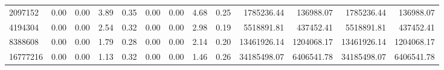 \begin{tabular}{lrrrrrrrrrrrr}
2097152  &        0.00 &        0.00 &          3.89 &          0.35 &           0.00 &           0.00 &         4.68 &         0.25 &       1785236.44 &        136988.07 &      1785236.44 &       136988.07 \\
4194304  &        0.00 &        0.00 &          2.54 &          0.32 &           0.00 &           0.00 &         2.98 &         0.19 &       5518891.81 &        437452.41 &      5518891.81 &       437452.41 \\
8388608  &        0.00 &        0.00 &          1.79 &          0.28 &           0.00 &           0.00 &         2.14 &         0.20 &      13461926.14 &       1204068.17 &     13461926.14 &      1204068.17 \\
16777216 &        0.00 &        0.00 &          1.13 &          0.32 &           0.00 &           0.00 &         1.46 &         0.26 &      34185498.07 &       6406541.78 &     34185498.07 &      6406541.78 \\
\bottomrule
\end{tabular}
